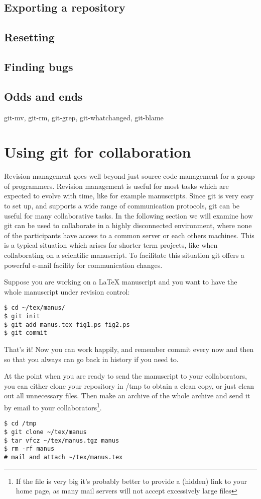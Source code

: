 \documentclass[a4paper,10pt]{article}
\begin{document}
\subsection{Exporting a repository}
\subsection{Resetting}
\subsection{Finding bugs}
\subsection{Odds and ends}
git-mv, git-rm, git-grep, git-whatchanged, git-blame

\section{Using git for collaboration}
Revision management goes well beyond just source code management for a group
of programmers. Revision management is useful for most tasks which are
expected to evolve with time, like for example manuscripts.
Since git is very easy to set up, and supports a wide range of communication
protocols, git can be useful for many collaborative tasks. In the following
section we will examine how git can be used to collaborate in a highly
disconnected environment, where none of the participants have access to a
common server or each others machines. This is a typical situation which
arises for shorter term projects, like when collaborating on a scientific
manuscript. To facilitate this situation git offers a powerful e-mail facility
for communication changes.

Suppose you are working on a LaTeX manuscript and you want to have the whole
manuscript under revision control:
\begin{verbatim}
$ cd ~/tex/manus/
$ git init
$ git add manus.tex fig1.ps fig2.ps
$ git commit
\end{verbatim}
That's it! Now you can work happily, and remember commit every now and then so
that you always can go back in history if you need to. 

At the point when you are ready to send the manuscript to your collaborators,
you can either clone your repository in /tmp to obtain a clean copy, or just
clean out all unnecessary files. Then make an archive of the whole archive and
send it by email to your collaborators\footnote{If the file is very big it's
probably better to provide a (hidden) link to your home page, as many mail
servers will not accept excessively large files}. 
\begin{verbatim}
$ cd /tmp
$ git clone ~/tex/manus
$ tar vfcz ~/tex/manus.tgz manus
$ rm -rf manus
# mail and attach ~/tex/manus.tex
\end{verbatim}
\end{document}
